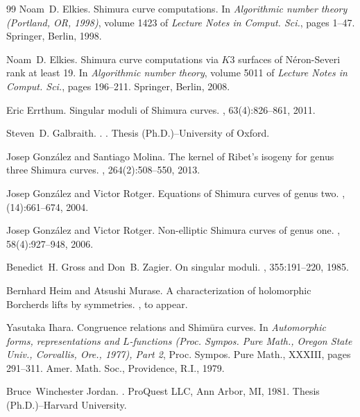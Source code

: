 \documentclass{amsart}
\theoremstyle{definition}
\begin{document}
\begin{thebibliography}{99}
Noam~D. Elkies.
\newblock Shimura curve computations.
\newblock In {\em Algorithmic number theory ({P}ortland, {OR}, 1998)}, volume
  1423 of {\em Lecture Notes in Comput. Sci.}, pages 1--47. Springer, Berlin,
  1998.

Noam~D. Elkies.
\newblock Shimura curve computations via {$K3$} surfaces of {N}\'eron-{S}everi
  rank at least 19.
\newblock In {\em Algorithmic number theory}, volume 5011 of {\em Lecture Notes
  in Comput. Sci.}, pages 196--211. Springer, Berlin, 2008.

Eric Errthum.
\newblock Singular moduli of {S}himura curves.
, 63(4):826--861, 2011.

Steven~D. Galbraith.
.
.
\newblock Thesis (Ph.D.)--University of Oxford.

Josep Gonz{\'a}lez and Santiago Molina.
\newblock The kernel of {R}ibet’s isogeny for genus three {S}himura curves.
, 264(2):508--550, 2013.

Josep Gonz{\'a}lez and Victor Rotger.
\newblock Equations of {S}himura curves of genus two.
, (14):661--674, 2004.

Josep Gonz{\'a}lez and Victor Rotger.
\newblock Non-elliptic {S}himura curves of genus one.
, 58(4):927--948, 2006.

Benedict~H. Gross and Don~B. Zagier.
\newblock On singular moduli.
, 355:191--220, 1985.

Bernhard Heim and Atsushi Murase.
\newblock A characterization of holomorphic {B}orcherds lifts by symmetries.
, to appear.

Yasutaka Ihara.
\newblock Congruence relations and {S}him\=ura curves.
\newblock In {\em Automorphic forms, representations and {$L$}-functions
  ({P}roc. {S}ympos. {P}ure {M}ath., {O}regon {S}tate {U}niv., {C}orvallis,
  {O}re., 1977), {P}art 2}, Proc. Sympos. Pure Math., XXXIII, pages 291--311.
  Amer. Math. Soc., Providence, R.I., 1979.

Bruce~Winchester Jordan.
.
\newblock ProQuest LLC, Ann Arbor, MI, 1981.
\newblock Thesis (Ph.D.)--Harvard University.


\end{thebibliography}
\end{document}
